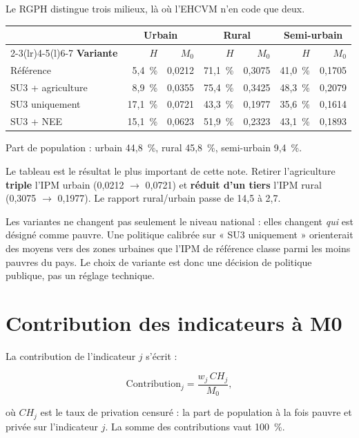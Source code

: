 \documentclass[11pt,a4paper]{article}
\begin{document}
Le RGPH distingue trois milieux, là où l'EHCVM n'en code que deux.

\begin{center}
\small
\begin{tabular}{@{}p{4.2cm}rrrrrr@{}}
\toprule
& \multicolumn{2}{c}{\textbf{Urbain}} & \multicolumn{2}{c}{\textbf{Rural}} &
\multicolumn{2}{c}{\textbf{Semi-urbain}} \\
\cmidrule(lr){2-3}\cmidrule(lr){4-5}\cmidrule(l){6-7}
\textbf{Variante} & $H$ & $M_0$ & $H$ & $M_0$ & $H$ & $M_0$ \\
\midrule
Référence & 5,4~\% & 0,0212 & 71,1~\% & 0,3075 & 41,0~\% & 0,1705 \\
SU3 + agriculture & 8,9~\% & 0,0355 & 75,4~\% & 0,3425 & 48,3~\% & 0,2079 \\
SU3 uniquement & 17,1~\% & 0,0721 & 43,3~\% & 0,1977 & 35,6~\% & 0,1614 \\
SU3 + NEE & 15,1~\% & 0,0623 & 51,9~\% & 0,2323 & 43,1~\% & 0,1893 \\
\bottomrule
\end{tabular}
\end{center}

Part de population : urbain 44,8~\%, rural 45,8~\%, semi-urbain 9,4~\%.

Le tableau est le résultat le plus important de cette note. Retirer l'agriculture
\textbf{triple} l'IPM urbain (0,0212 $\rightarrow$ 0,0721) et \textbf{réduit d'un tiers} l'IPM
rural (0,3075 $\rightarrow$ 0,1977). Le rapport rural/urbain passe de 14,5 à 2,7.

\begin{attention}
Les variantes ne changent pas seulement le niveau national : elles changent \emph{qui} est
désigné comme pauvre. Une politique calibrée sur « SU3 uniquement » orienterait des moyens vers
des zones urbaines que l'IPM de référence classe parmi les moins pauvres du pays. Le choix de
variante est donc une décision de politique publique, pas un réglage technique.
\end{attention}

\section{Contribution des indicateurs à M0}

La contribution de l'indicateur $j$ s'écrit :

\[
  \mathrm{Contribution}_j = \frac{w_j\,CH_j}{M_0},
\]

où $CH_j$ est le taux de privation censuré : la part de population à la fois pauvre et privée
sur l'indicateur $j$. La somme des contributions vaut 100~\%.
\end{document}
